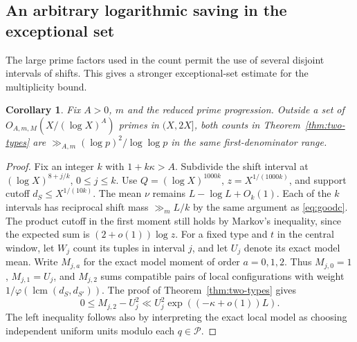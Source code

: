 \documentclass[a4paper,11pt]{article}
\newtheorem{corollary}[theorem]{Corollary}
\begin{document}
\subsection{An arbitrary logarithmic saving in the exceptional set}
The large prime factors used in the count permit the use of several disjoint intervals of shifts. This gives a stronger exceptional-set estimate for the multiplicity bound.
\begin{corollary}\label{cor:multamps}
Fix $A>0$, $m$ and the reduced prime progression. Outside a set of
$O_{A,m,M}(X/(\log X)^A)$ primes in $(X,2X]$, both counts in Theorem~\ref{thm:two-types} are $\gg_{A,m}(\log p)^2/\log\log p$ in the same first-denominator range.
\end{corollary}
\begin{proof}
Fix an integer $k$ with $1+k\kappa>A$. Subdivide the
shift interval at $(\log X)^{8+j/k}$, $0\le j\le k$.
Use $Q=(\log X)^{1000k}$, $z=X^{1/(1000k)}$, and support
cutoff $d_S\le X^{1/(10k)}$. The mean $\nu$ remains
$L-\log L+O_k(1)$. Each of the $k$ intervals has reciprocal shift
mass $\gg_m L/k$ by the same argument as \eqref{eq:goodc}.
The product cutoff in the first moment still holds by Markov's inequality,
since the expected sum is $(2+o(1))\log z$. For a fixed type and $t$ in
the central window, let $W_j$ count its tuples in interval $j$, and
let $U_j$ denote its exact model mean. Write $M_{j,a}$ for the exact
model moment of order $a=0,1,2$. Thus $M_{j,0}=1$, $M_{j,1}=U_j$,
and $M_{j,2}$ sums compatible pairs of local configurations with weight
$1/\varphi(\operatorname{lcm}(d_S,d_{S'}))$. The proof of
Theorem~\ref{thm:two-types} gives
\[
 0\le M_{j,2}-U_j^2\ll
 U_j^2\exp((-\kappa+o(1))L).
\]
The left inequality follows also by interpreting the exact local
model as choosing independent uniform units modulo each $q\in\mathcal P$.


\end{proof}
\end{document}
